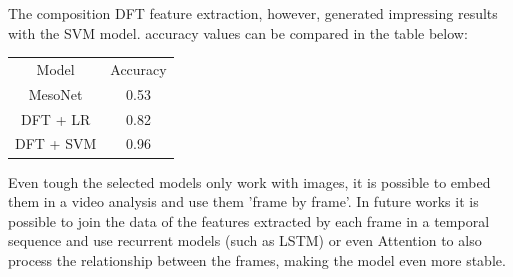 \documentclass{bmvc2k}
\begin{document}
The composition DFT feature extraction, however, generated impressing results with the SVM model. accuracy values can be compared in the table below:

\begin{center}
\begin{tabular}{ c c }
 Model & Accuracy\\
 MesoNet & 0.53 \\ 
 DFT + LR & 0.82 \\
 DFT + SVM & 0.96
\end{tabular}
\end{center}

Even tough the selected models only work with images, it is possible to embed them in a video analysis and use them 'frame by frame'. In future works it is possible to join the data of the features extracted by each frame in a temporal sequence and use recurrent models (such as LSTM) or even Attention to also process the relationship between the frames, making the model even more stable.



\end{document}

